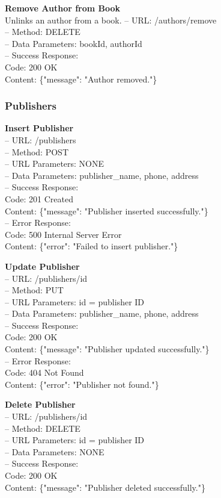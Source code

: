 \textbf{Remove Author from Book} \\
Unlinks an author from a book.
– URL: /authors/remove \\
– Method: DELETE \\
– Data Parameters: bookId, authorId \\
– Success Response: \\
Code: 200 OK \\
Content: \{"message": "Author removed."\}

\subsubsection*{Publishers}

\textbf{Insert Publisher} \\
– URL: /publishers \\
– Method: POST \\
– URL Parameters: NONE \\
– Data Parameters: publisher\_name, phone, address \\
– Success Response: \\
Code: 201 Created \\
Content: \{"message": "Publisher inserted successfully."\} \\
– Error Response: \\
Code: 500 Internal Server Error \\
Content: \{"error": "Failed to insert publisher."\}

\textbf{Update Publisher} \\
– URL: /publishers/{id} \\
– Method: PUT \\
– URL Parameters: id = publisher ID \\
– Data Parameters: publisher\_name, phone, address \\
– Success Response: \\
Code: 200 OK \\
Content: \{"message": "Publisher updated successfully."\} \\
– Error Response: \\
Code: 404 Not Found \\
Content: \{"error": "Publisher not found."\}

\textbf{Delete Publisher} \\
– URL: /publishers/{id} \\
– Method: DELETE \\
– URL Parameters: id = publisher ID \\
– Data Parameters: NONE \\
– Success Response: \\
Code: 200 OK \\
Content: \{"message": "Publisher deleted successfully."\}


